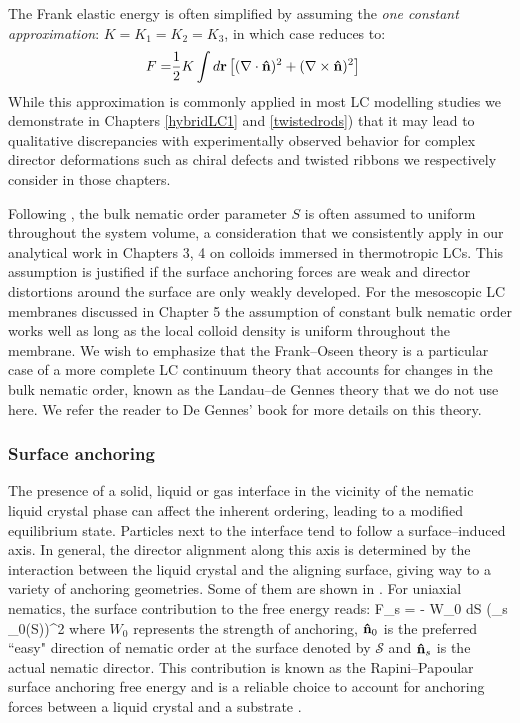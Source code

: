 The Frank elastic energy is often simplified by assuming the {\em one constant approximation}: $K =K_1=K_2=K_3$, in which case  reduces to:
\begin{align}
F = & \frac{1}{2} K \int d {\bf r} \left [ (\nabla \cdot {\bf \hat{n}})^{2}  + (\nabla \times {\bf \hat{n}})^{2} \right ]
\end{align}
While this approximation is commonly applied in most LC modelling studies we demonstrate in Chapters \ref{hybridLC1} and  \ref{twistedrods}) that it may lead to qualitative discrepancies with experimentally observed behavior for complex director deformations such as chiral defects and twisted ribbons we respectively consider in those chapters.

Following , the bulk nematic order parameter $S$ is often assumed to uniform throughout the system volume, a consideration that we consistently apply in our analytical work in Chapters 3, 4 on colloids immersed in thermotropic LCs. This assumption is justified if the surface anchoring forces are weak and director distortions around the surface are only weakly developed. For the mesoscopic LC membranes discussed in Chapter 5 the assumption of constant bulk nematic order works well as long as the local colloid density is uniform throughout the membrane. We wish to emphasize that the Frank--Oseen theory  is a particular case of a more complete LC continuum theory that accounts for changes in the bulk nematic order, known as the Landau--de Gennes theory that we do not use here. We refer the reader to De Gennes' book \cite{gennes-prost} for more details on this theory.

\subsubsection{Surface anchoring}

The presence of a solid, liquid or gas interface in the vicinity of the nematic liquid crystal phase can affect the inherent ordering, leading to a modified equilibrium state. Particles next to the interface tend to follow a surface--induced axis. In general, the director alignment along this axis is determined by the interaction between the liquid crystal and the aligning surface, giving way to a variety of anchoring geometries. Some of them are shown in . For uniaxial nematics, the surface contribution to the free energy reads:
\beq
F_{s} = - W_{0} \oint d{\mathcal S}  (\bn_s \cdot \bn_{0}({\mathcal S}))^{2}
\eeq
where $W_0$ represents the strength of anchoring, ${\bf \hat{n}}_{0}$ is the preferred ``easy" direction of nematic order at the surface denoted by $\mathcal S$ and ${\bf \hat{n}}_s$ is the actual nematic director. This contribution is known as the Rapini--Papoular surface anchoring free energy \cite{rapini1969} and is a reliable choice to account for anchoring forces between a liquid crystal and a substrate \cite{barbero1986validity}.

